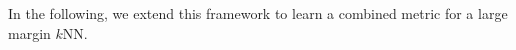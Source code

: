 In the following, we extend this framework to learn a combined metric for a large margin $k$NN.





